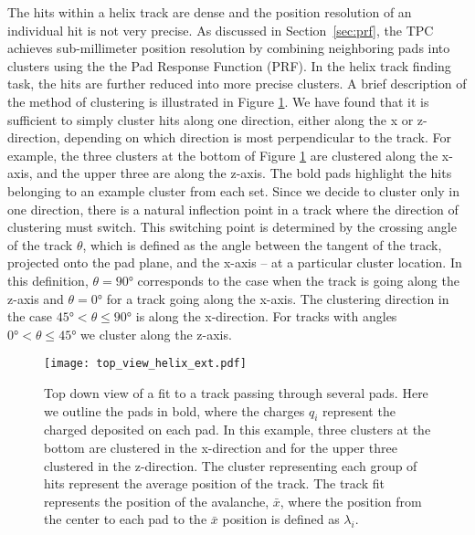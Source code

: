 The hits within a helix track are dense and the position resolution of an individual hit is not very precise. As discussed in Section~\ref{sec:prf}, the TPC achieves sub-millimeter position resolution by combining neighboring pads into clusters using the the Pad Response Function (PRF). In the helix track finding task, the hits are further reduced into more precise clusters. A brief description of the method of clustering is illustrated in Figure \ref{fig:topview}. We have found that it is sufficient to simply cluster hits along one direction, either along the x or z-direction, depending on which direction is most perpendicular to the track. For example, the three clusters at the bottom of Figure \ref{fig:topview} are clustered along the x-axis, and the upper three are along the z-axis. The bold pads highlight the hits belonging to an example cluster from each set. Since we decide to cluster only in one direction, there is a natural inflection point in a track where the direction of clustering must switch. This switching point is determined by the crossing angle of the track $\theta$, which is defined as the angle between the tangent of the track, projected onto the pad plane, and the x-axis -- at a particular cluster location. In this definition, $\theta = \ang{90}$ corresponds to the case when the track is going along the z-axis and $\theta = \ang{0}$ for a track going along the x-axis.  The clustering direction in the case $\ang{45} < \theta \leq \ang{90} $ is along the x-direction. For tracks with angles $\ang{0} < \theta \leq \ang{45}$ we cluster along the z-axis. 

 

\begin{figure}[!htb]
\centering
\texttt{[image: top\_view\_helix\_ext.pdf]}
\caption{Top down view of a fit to a track passing through several pads. Here we outline the pads in bold, where the charges $q_i$ represent the charged deposited on each pad. In this example, three clusters at the bottom are clustered in the x-direction and for the upper three clustered in the z-direction. The cluster representing each group of hits represent the average position of the track. The track fit represents the position of the avalanche, $\bar{x}$,  where the position from the center to each pad to the $\bar{x}$ position is defined as $\lambda_i$.}
\label{fig:topview}
\end{figure}

